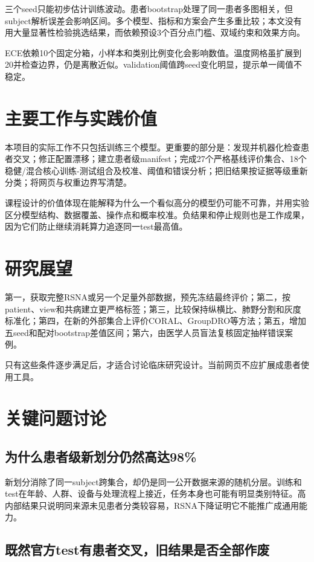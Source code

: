 三个seed只能初步估计训练波动。患者bootstrap处理了同一患者多图相关，但subject解析误差会影响区间。多个模型、指标和方案会产生多重比较；本文没有用大量显著性检验挑选结果，而依赖预设3个百分点门槛、双域约束和效果方向。

ECE依赖10个固定分箱，小样本和类别比例变化会影响数值。温度网格虽扩展到20并检查边界，仍是离散近似。validation阈值跨seed变化明显，提示单一阈值不稳定。

\section{主要工作与实践价值}

本项目的实际工作不只包括训练三个模型。更重要的部分是：发现并机器化检查患者交叉；修正配置漂移；建立患者级manifest；完成27个严格基线评价集合、18个稳健/混合核心训练-测试组合及校准、阈值和错误分析；把旧结果按证据等级重新分类；将网页与权重边界写清楚。

课程设计的价值体现在能解释为什么一个看似高分的模型仍可能不可靠，并用实验区分模型结构、数据覆盖、操作点和概率校准。负结果和停止规则也是工作成果，因为它们防止继续消耗算力追逐同一test最高值。

\section{研究展望}

第一，获取完整RSNA或另一个足量外部数据，预先冻结最终评价；第二，按patient、view和共病建立更严格标签；第三，比较保持纵横比、肺野分割和灰度标准化；第四，在新的外部集合上评价CORAL、GroupDRO等方法；第五，增加五seed和配对bootstrap差值区间；第六，由医学人员盲法复核固定抽样错误案例。

只有这些条件逐步满足后，才适合讨论临床研究设计。当前网页不应扩展成患者使用工具。

\section{关键问题讨论}

\subsection{为什么患者级新划分仍然高达98\%}

新划分消除了同一subject跨集合，却仍是同一公开数据来源的随机分层。训练和test在年龄、人群、设备与处理流程上接近，任务本身也可能有明显类别特征。高内部结果只说明同来源未见患者分类较容易，RSNA下降证明它不能推广成通用能力。

\subsection{既然官方test有患者交叉，旧结果是否全部作废}

